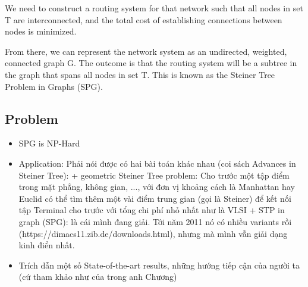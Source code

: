 \documentclass[runningheads]{llncs}
\begin{document}
We need to construct a routing system for that network such that all nodes in set T are interconnected, 
and the total cost of establishing connections between nodes is minimized.

From there, we can represent the network system as an undirected, weighted, connected graph G. 
The outcome is that the routing system will be a subtree in the graph that spans all nodes in set T. 
This is known as the Steiner Tree Problem in Graphs (SPG).

\subsection{Problem}

\begin{itemize}
    \item SPG is NP-Hard
    \item Application: Phải nói được có hai bài toán khác nhau (coi sách Advances in Steiner Tree):
        + geometric Steiner Tree problem: Cho trước một tập điểm trong mặt phẳng, không gian, ..., với đơn vị khoảng cách là Manhattan hay Euclid
        có thể tìm thêm một vài điểm trung gian (gọi là Steiner) để kết nối tập Terminal cho trước với tổng chi phí nhỏ nhất
        như là VLSI
        + STP in graph (SPG): là cái mình đang giải. Tới năm 2011 nó có nhiều variants rồi (https://dimacs11.zib.de/downloads.html),
        nhưng mà mình vẫn giải dạng kinh điển nhất.
    \item Trích dẫn một số State-of-the-art results, những hướng tiếp cận của người ta (cứ tham khảo như của trong anh Chương)
\end{itemize}
\end{document}
